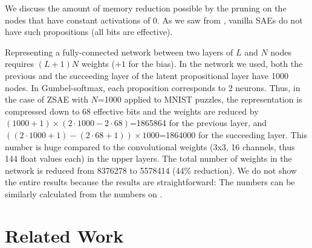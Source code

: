 
We discuss the amount of memory reduction possible by the pruning on the nodes
that have constant activations of 0. As we saw from ,
vanilla SAEs do not have such propositions (all bits are effective).

Representing a fully-connected
network between two layers of $L$ and $N$ nodes requires $(L+1)N$
weights ($+1$ for the bias).
In the network we used,
both the previous and the succeeding layer of the latent propositional layer have 1000 nodes.
In Gumbel-softmax, each proposition corresponds to 2 neurons.
Thus, in the case of ZSAE with $N$=1000 applied to MNIST puzzles,
the representation is compressed down to 68 effective bits and
the weights are reduced by $(1000+1)\times (2\cdot 1000 - 2\cdot 68)$=1865864 for the previous layer,
and $((2\cdot 1000+1)-(2\cdot 68+1))\times 1000 $=1864000 for the succeeding layer.
This number is huge compared to the convolutional weights (3x3, 16 channels, thus 144 float values each) in the upper layers.
The total number of weights in the network is reduced from 8376278 to 5578414 (44\% reduction).
We do not show the entire results because the results are straightforward:
The numbers can be similarly calculated from the numbers on .


\section{Related Work}

